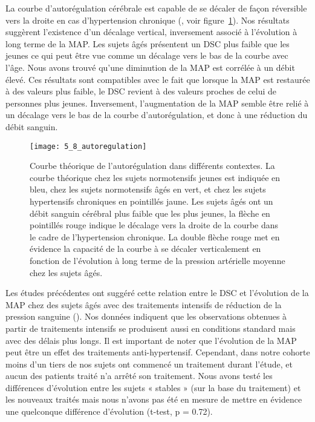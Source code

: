 La courbe d’autorégulation cérébrale est capable de se décaler de façon réversible vers la
droite en cas d’hypertension chronique (\cite{Traon2002}, voir figure~\ref{fig:5_8_autoregulation}). Nos résultats suggèrent l’existence d’un
décalage vertical, inversement associé à l’évolution à long terme de la MAP. Les sujets âgés présentent
un DSC plus faible que les jeunes ce qui peut être vue comme un décalage vers le bas de la courbe avec
l’âge. Nous avons trouvé qu’une diminution de la MAP est corrélée à un débit élevé. Ces résultats sont
compatibles avec le fait que lorsque la MAP est restaurée à des valeurs plus faible, le DSC revient à des
valeurs proches de celui de personnes plus jeunes. Inversement, l’augmentation de la MAP semble
être relié à un décalage vers le bas de la courbe d’autorégulation, et donc à une réduction du débit
sanguin.\\
\begin{figure}[!t]
\centering
\texttt{[image: 5\_8\_autoregulation]}
\caption{Courbe théorique de l'autorégulation dans différents contextes. La courbe théorique chez les sujets normotensifs
jeunes est indiquée en bleu, chez les sujets normotensifs âgés en vert, et chez les sujets hypertensifs chroniques en pointillés
jaune. Les sujets âgés ont un débit sanguin cérébral plus faible que les plus jeunes, la flèche en pointillés rouge indique le
décalage vers la droite de la courbe dans le cadre de l’hypertension chronique. La double flèche rouge met en évidence la
capacité de la courbe à se décaler verticalement en fonction de l’évolution à long terme de la pression artérielle moyenne
chez les sujets âgés.}
\label{fig:5_8_autoregulation}	
\end{figure}
Les études précédentes ont suggéré cette relation entre le DSC et l’évolution de la MAP chez
des sujets âgés avec des traitements intensifs de réduction de la pression sanguine (\cite{Tryambake2013}). Nos données
indiquent que les observations obtenues à partir de traitements intensifs se produisent aussi en
conditions standard mais avec des délais plus longs. Il est important de noter que l’évolution de la MAP
peut être un effet des traitements anti-hypertensif. Cependant, dans notre cohorte moins d’un tiers
de nos sujets ont commencé un traitement durant l’étude, et aucun des patients traité n’a arrêté son
traitement. Nous avons testé les différences d’évolution entre les sujets « stables » (sur la base du
traitement) et les nouveaux traités mais nous n’avons pas été en mesure de mettre en évidence une
quelconque différence d’évolution (t-test, p = 0.72).\\
